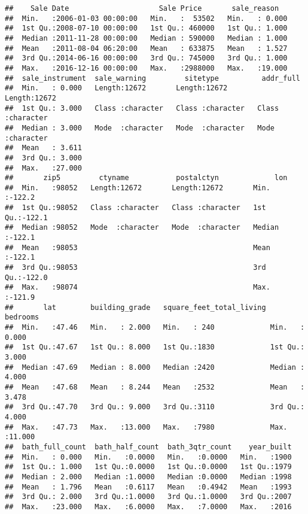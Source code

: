 \documentclass[
]{article}
\begin{document}
\begin{verbatim}
##    Sale Date                     Sale Price       sale_reason    
##  Min.   :2006-01-03 00:00:00   Min.   :  53502   Min.   : 0.000  
##  1st Qu.:2008-07-10 00:00:00   1st Qu.: 460000   1st Qu.: 1.000  
##  Median :2011-11-28 00:00:00   Median : 590000   Median : 1.000  
##  Mean   :2011-08-04 06:20:00   Mean   : 633875   Mean   : 1.527  
##  3rd Qu.:2014-06-16 00:00:00   3rd Qu.: 745000   3rd Qu.: 1.000  
##  Max.   :2016-12-16 00:00:00   Max.   :2988000   Max.   :19.000  
##  sale_instrument  sale_warning         sitetype          addr_full        
##  Min.   : 0.000   Length:12672       Length:12672       Length:12672      
##  1st Qu.: 3.000   Class :character   Class :character   Class :character  
##  Median : 3.000   Mode  :character   Mode  :character   Mode  :character  
##  Mean   : 3.611                                                           
##  3rd Qu.: 3.000                                                           
##  Max.   :27.000                                                           
##       zip5         ctyname           postalctyn             lon        
##  Min.   :98052   Length:12672       Length:12672       Min.   :-122.2  
##  1st Qu.:98052   Class :character   Class :character   1st Qu.:-122.1  
##  Median :98052   Mode  :character   Mode  :character   Median :-122.1  
##  Mean   :98053                                         Mean   :-122.1  
##  3rd Qu.:98053                                         3rd Qu.:-122.0  
##  Max.   :98074                                         Max.   :-121.9  
##       lat        building_grade   square_feet_total_living    bedrooms     
##  Min.   :47.46   Min.   : 2.000   Min.   : 240             Min.   : 0.000  
##  1st Qu.:47.67   1st Qu.: 8.000   1st Qu.:1830             1st Qu.: 3.000  
##  Median :47.69   Median : 8.000   Median :2420             Median : 4.000  
##  Mean   :47.68   Mean   : 8.244   Mean   :2532             Mean   : 3.478  
##  3rd Qu.:47.70   3rd Qu.: 9.000   3rd Qu.:3110             3rd Qu.: 4.000  
##  Max.   :47.73   Max.   :13.000   Max.   :7980             Max.   :11.000  
##  bath_full_count  bath_half_count  bath_3qtr_count    year_built  
##  Min.   : 0.000   Min.   :0.0000   Min.   :0.0000   Min.   :1900  
##  1st Qu.: 1.000   1st Qu.:0.0000   1st Qu.:0.0000   1st Qu.:1979  
##  Median : 2.000   Median :1.0000   Median :0.0000   Median :1998  
##  Mean   : 1.796   Mean   :0.6117   Mean   :0.4942   Mean   :1993  
##  3rd Qu.: 2.000   3rd Qu.:1.0000   3rd Qu.:1.0000   3rd Qu.:2007  
##  Max.   :23.000   Max.   :6.0000   Max.   :7.0000   Max.   :2016  

\end{verbatim}
\end{document}
